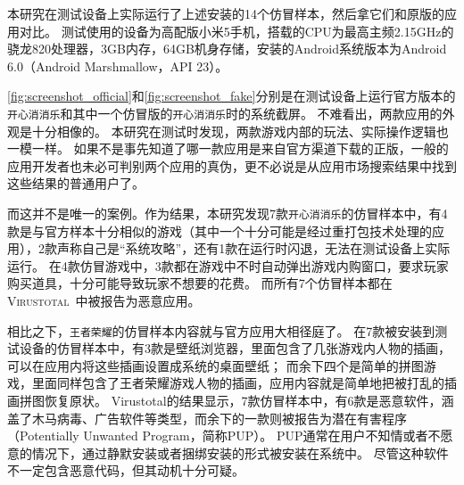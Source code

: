本研究在测试设备上实际运行了上述安装的14个仿冒样本，然后拿它们和原版的应用对比。
测试使用的设备为高配版小米5手机，搭载的CPU为最高主频2.15GHz的骁龙820处理器，3GB内存，64GB机身存储，安装的Android系统版本为Android 6.0（Android Marshmallow，API 23）。

\autoref{fig:screenshot_official}和\autoref{fig:screenshot_fake}分别是在测试设备上运行官方版本的\texttt{开心消消乐}和其中一个仿冒版的\texttt{开心消消乐}时的系统截屏。
不难看出，两款应用的外观是十分相像的。
本研究在测试时发现，两款游戏内部的玩法、实际操作逻辑也一模一样。
如果不是事先知道了哪一款应用是来自官方渠道下载的正版，一般的应用开发者也未必可判别两个应用的真伪，更不必说是从应用市场搜索结果中找到这些结果的普通用户了。

而这并不是唯一的案例。作为结果，本研究发现7款\texttt{开心消消乐}的仿冒样本中，有4款是与官方样本十分相似的游戏（其中一个十分可能是经过重打包技术处理的应用），2款声称自己是``系统攻略''，还有1款在运行时闪退，无法在测试设备上实际运行。
在4款仿冒游戏中，3款都在游戏中不时自动弹出游戏内购窗口，要求玩家购买道具，十分可能导致玩家不想要的花费。
而所有7个仿冒样本都在\textsc{Virustotal}~\cite{virustotal}中被报告为恶意应用。

相比之下，\texttt{王者荣耀}的仿冒样本内容就与官方应用大相径庭了。
在7款被安装到测试设备的仿冒样本中，有3款是壁纸浏览器，里面包含了几张游戏内人物的插画，可以在应用内将这些插画设置成系统的桌面壁纸；
而余下四个是简单的拼图游戏，里面同样包含了王者荣耀游戏人物的插画，应用内容就是简单地把被打乱的插画拼图恢复原状。
Virustotal的结果显示，7款仿冒样本中，有6款是恶意软件，涵盖了木马病毒、广告软件等类型，而余下的一款则被报告为潜在有害程序（Potentially Unwanted Program，简称PUP）。
PUP通常在用户不知情或者不愿意的情况下，通过静默安装或者捆绑安装的形式被安装在系统中。
尽管这种软件不一定包含恶意代码，但其动机十分可疑。

